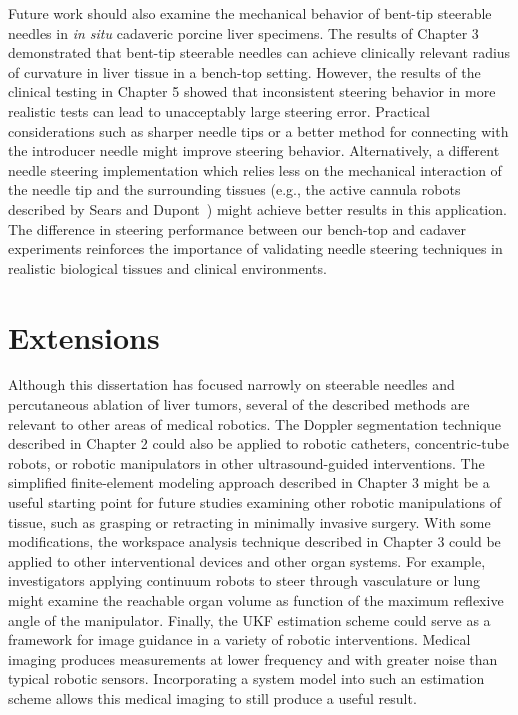 Future work should also examine the mechanical behavior of bent-tip steerable needles in \textit{in situ} cadaveric porcine liver specimens. The results of Chapter 3 demonstrated that bent-tip steerable needles can achieve clinically relevant radius of curvature in liver tissue in a bench-top setting. However, the results of the clinical testing in Chapter 5 showed that inconsistent steering behavior in more realistic tests can lead to unacceptably large steering error. Practical considerations such as sharper needle tips or a better method for connecting with the introducer needle might improve steering behavior. Alternatively, a different needle steering implementation which relies less on the mechanical interaction of the needle tip and the surrounding tissues (e.g., the active cannula robots described by Sears and Dupont~\cite{Sears2006}) might achieve better results in this application. The difference in steering performance between our bench-top and cadaver experiments reinforces the importance of validating needle steering techniques in realistic biological tissues and clinical environments. 

\section{Extensions}
Although this dissertation has focused narrowly on steerable needles and percutaneous ablation of liver tumors, several of the described methods are relevant to other areas of medical robotics. The Doppler segmentation technique described in Chapter 2 could also be applied to robotic catheters, concentric-tube robots, or robotic manipulators in other ultrasound-guided interventions. The simplified finite-element modeling approach described in Chapter 3 might be a useful starting point for future studies examining other robotic manipulations of tissue, such as grasping or retracting in minimally invasive surgery. With some modifications, the workspace analysis technique described in Chapter 3 could be applied to other interventional devices and other organ systems. For example, investigators applying continuum robots to steer through vasculature or lung might examine the reachable organ volume as function of the maximum reflexive angle of the manipulator. Finally, the UKF estimation scheme could serve as a framework for image guidance in a variety of robotic interventions. Medical imaging produces measurements at lower frequency and with greater noise than typical robotic sensors. Incorporating a system model into such an estimation scheme allows this medical imaging to still produce a useful result.




